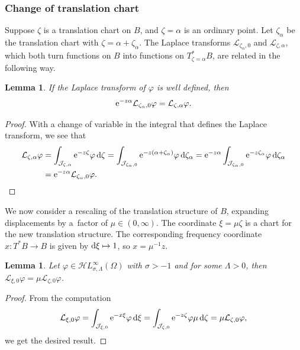 \documentclass[10pt,a4paper]{amsart}
\newcommand{\singexp}[2]{\mathcal{H}L^\infty_{#1, #2}}
\newcommand{\maps}{\colon}
\newcommand{\laplace}{\mathcal{L}}
\numberwithin{equation}{section}
\newtheorem{Lemma}[Theorem]{Lemma}
\begin{document}
\subsubsection{Change of translation chart}\label{sec:change-translation}
Suppose $\zeta$ is a translation chart on $B$, and $\zeta = \alpha$ is an ordinary point. Let $\zeta_\alpha$ be the translation chart with $\zeta = \alpha + \zeta_\alpha$. The Laplace transforms $\laplace_{\zeta_\alpha, 0}$ and $\laplace_{\zeta, \alpha}$, which both turn functions on $B$ into functions on $T^*_{\zeta = \alpha}B$, are related in the following way.
\begin{Lemma}\label{translation}
If the Laplace transform of $\varphi$ is well defined, then
 \begin{equation}
 \label{change-chart}
 {\rm e}^{-z\alpha} \laplace_{\zeta_\alpha, 0} \varphi = \laplace_{\zeta, \alpha} \varphi.
\end{equation}
\end{Lemma}
\begin{proof}
With a change of variable in the integral that defines the Laplace transform, we see that
\begin{align*}
\laplace_{\zeta, \alpha} \varphi & = \int_{\mathcal{J}_{\zeta,\alpha}} {\rm e}^{-z \zeta} \varphi \,{\rm d}\zeta = \int_{\mathcal{J}_{\zeta_\alpha,0}} {\rm e}^{-z(\alpha + \zeta_\alpha)} \varphi \,{\rm d}\zeta_\alpha = {\rm e}^{-z\alpha } \int_{\mathcal{J}_{\zeta_\alpha,0}} {\rm e}^{-z\zeta_\alpha} \varphi\, {\rm d}\zeta_\alpha \\
& = {\rm e}^{-z\alpha } \laplace_{\zeta_\alpha, 0} \varphi.\tag*{\qed}
\end{align*} \renewcommand{\qed}{}
\end{proof}

We now consider a rescaling of the translation structure of $B$, expanding displacements by a~factor of $\mu \in (0, \infty)$. The coordinate $\xi = \mu\zeta$ is a chart for the new translation structure. The corresponding frequency coordinate $x \maps T^*B \to B$ is given by ${\rm d}\xi \mapsto 1$, so $x = \mu^{-1} z$.
\begin{Lemma}
Let $\varphi\in\singexp{\sigma}{\Lambda}(\Omega)$ with $\sigma>-1$ and for some $\Lambda>0$, then
$\laplace_{\xi, 0} \varphi = \mu \laplace_{\zeta, 0} \varphi$.
\end{Lemma}
\begin{proof}
 From the computation
 \begin{equation*}
\laplace_{\xi, 0} \varphi = \int_{\mathcal{J}_{\xi, 0}} {\rm e}^{-x\xi} \varphi \,{\rm d}\xi = \int_{\mathcal{J}_{\zeta, 0}} {\rm e}^{-z \zeta} \varphi \mu \,{\rm d}\zeta = \mu \laplace_{\zeta, 0} \varphi,
\end{equation*}
we get the desired result.
\end{proof}
\end{document}
